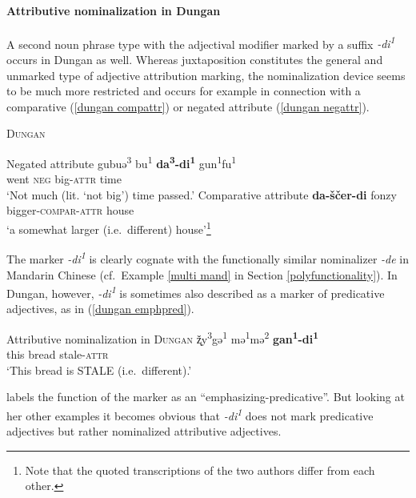 \paragraph{Attributive nominalization in Dungan}
A second noun phrase type with the adjectival modifier marked by a suffix \textit{-di\textsuperscript{1}} occurs in Dungan as well. Whereas juxtaposition constitutes the general and unmarked type of adjective attribution marking, the nominalization device seems to be much more restricted and occurs for example in connection with a comparative (\ref{dungan compattr}) or negated attribute (\ref{dungan negattr}).
\begin{exe}
\ex \textsc{Dungan}
\begin{xlist}
\ex Negated attribute \cite[80]{zevachina2001} \label{dungan negattr}
\gll	gubuə\textsuperscript{3} bu\textsuperscript{1} \textbf{da\textsuperscript{3}-di\textsuperscript{1}} gun\textsuperscript{1}fu\textsuperscript{1}\\
	went \textsc{neg} big-\textsc{attr} time\\
\glt	‘Not much (lit. ‘not big’) time passed.’
\ex Comparative attribute \cite[480]{kalimov1968} \label{dungan compattr}
\gll	\textbf{da-ščer-di} fonzy\\
	bigger-\textsc{compar}-\textsc{attr} house\\
\glt	‘a somewhat larger (i.e.~different) house’\footnote{Note that the quoted transcriptions of the two authors differ from each other.}
\end{xlist}
\end{exe}	
The marker \textit{-di\textsuperscript{1}} is clearly cognate with the functionally similar nominalizer \textit{-de} in Mandarin Chinese (cf.~Example \ref{multi mand} in Section \ref{polyfunctionality}). In Dungan, however, \textit{-di\textsuperscript{1}} is sometimes also described as a marker of predicative adjectives, as in (\ref{dungan emphpred}).
\begin{exe}
\ex	Attributive nominalization in \textsc{Dungan} \cite[82]{zevachina2001}
\label{dungan emphpred}
\gll	ž̨y\textsuperscript{3}gə\textsuperscript{1} mə\textsuperscript{1}mə\textsuperscript{2} \textbf{gan\textsuperscript{1}-di\textsuperscript{1}}\\
	this bread stale-\textsc{attr}\\
\glt	‘This bread is STALE (i.e.~different).’
\end{exe}
\citet[82]{zevachina2001} labels the function of the marker as an “emphasizing-predicative”. But looking at her other examples it becomes obvious that \textit{-di\textsuperscript{1}} does not mark predicative adjectives but rather nominalized attributive adjectives.
